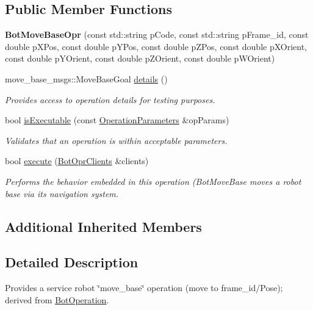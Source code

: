 \subsection*{Public Member Functions}
\begin{DoxyCompactItemize}
\item 
\hypertarget{classBotMoveBaseOpr_a269ba342770db907481955adb5bd9cec}{{\bfseries Bot\-Move\-Base\-Opr} (const std\-::string p\-Code, const std\-::string p\-Frame\-\_\-id, const double p\-X\-Pos, const double p\-Y\-Pos, const double p\-Z\-Pos, const double p\-X\-Orient, const double p\-Y\-Orient, const double p\-Z\-Orient, const double p\-W\-Orient)}\label{classBotMoveBaseOpr_a269ba342770db907481955adb5bd9cec}

\item 
move\-\_\-base\-\_\-msgs\-::\-Move\-Base\-Goal \hyperlink{classBotMoveBaseOpr_ad03fb9f3398b557549408752690e7d58}{details} ()
\begin{DoxyCompactList}\small\item\em Provides access to operation details for testing purposes. \end{DoxyCompactList}\item 
bool \hyperlink{classBotMoveBaseOpr_ae6a4ed7325d3bc728b6934250171178d}{is\-Executable} (const \hyperlink{classOperationParameters}{Operation\-Parameters} \&op\-Params)
\begin{DoxyCompactList}\small\item\em Validates that an operation is within acceptable parameters. \end{DoxyCompactList}\item 
bool \hyperlink{classBotMoveBaseOpr_aebac9f650a9960e132dccc61e54b8c93}{execute} (\hyperlink{classBotOprClients}{Bot\-Opr\-Clients} \&clients)
\begin{DoxyCompactList}\small\item\em Performs the behavior embedded in this operation (Bot\-Move\-Base moves a robot base via its navigation system. \end{DoxyCompactList}\end{DoxyCompactItemize}
\subsection*{Additional Inherited Members}


\subsection{Detailed Description}
Provides a service robot \char`\"{}move\-\_\-base\char`\"{} operation (move to frame\-\_\-id/\-Pose); derived from \hyperlink{classBotOperation}{Bot\-Operation}. 

